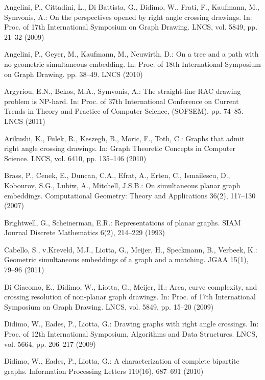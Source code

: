 \documentclass{llncs}
\begin{document}
\begin{thebibliography}{10}
\providecommand{\url}[1]{\texttt{#1}}
\providecommand{\urlprefix}{URL }

Angelini, P., Cittadini, L., {Di Battista}, G., Didimo, W., Frati,
F.,
  Kaufmann, M., Symvonis, A.: On the perspectives opened by right angle
  crossing drawings. In: Proc. of 17th International Symposium on Graph
  Drawing. LNCS, vol. 5849, pp. 21--32 (2009)

Angelini, P., Geyer, M., Kaufmann, M., Neuwirth, D.: On a tree and a
path with
  no geometric simultaneous embedding. In: Proc. of 18th International
  Symposium on Graph Drawing. pp. 38--49. LNCS (2010)

Argyriou, E.N., Bekos, M.A., Symvonis, A.: The straight-line
{R}{A}{C} drawing
  problem is {N}{P}-hard. In: Proc. of 37th International Conference on Current
  Trends in Theory and Practice of Computer Science, (SOFSEM). pp. 74--85. LNCS
  (2011)

Arikushi, K., Fulek, R., Keszegh, B., Moric, F., Toth, C.: Graphs
that admit
  right angle crossing drawings. In: Graph Theoretic Concepts in Computer
  Science. LNCS, vol. 6410, pp. 135--146 (2010)

Brass, P., Cenek, E., Duncan, C.A., Efrat, A., Erten, C.,
Ismailescu, D.,
  Kobourov, S.G., Lubiw, A., Mitchell, J.S.B.: On simultaneous planar graph
  embeddings. Computational Geometry: Theory and Applications  36(2),  117--130
  (2007)

Brightwell, G., Scheinerman, E.R.: Representations of planar graphs.
SIAM
  Journal Discrete Mathematics  6(2),  214--229 (1993)

Cabello, S., v.Kreveld, M.J., Liotta, G., Meijer, H., Speckmann, B.,
Verbeek,
  K.: Geometric simultaneous embeddings of a graph and a matching. JGAA  15(1),
   79--96 (2011)

{Di Giacomo}, E., Didimo, W., Liotta, G., Meijer, H.: Area, curve
complexity,
  and crossing resolution of non-planar graph drawings. In: Proc. of 17th
  International Symposium on Graph Drawing. LNCS, vol. 5849, pp. 15--20 (2009)

Didimo, W., Eades, P., Liotta, G.: Drawing graphs with right angle
crossings.
  In: Proc. of 12th International Symposium, Algorithms and Data Structures.
  LNCS, vol. 5664, pp. 206--217 (2009)

Didimo, W., Eades, P., Liotta, G.: A characterization of complete
bipartite
  graphs. Information Processing Letters  110(16),  687--691 (2010)


\end{thebibliography}
\end{document}
